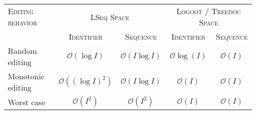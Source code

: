 
\begin{tabularx}{0.9\textwidth}{@{}Xcccc@{}}
  \toprule
  \textsc{Editing behavior} & \multicolumn{2}{c}{\textsc{LSeq Space}} & \multicolumn{2}{c}{\textsc{Logoot} / \textsc{Treedoc Space}} \\ \cmidrule{2-3} \cmidrule{4-5} 
                   & \textsc{Identifier} & \textsc{Sequence} & \textsc{Identifier} & \textsc{Sequence} \\ \midrule
  Random editing & $\mathcal{O}(\log I)$ & $\mathcal{O}(I\log I)$ & $\mathcal{O}\log(I)$ & $\mathcal{O}(I)$\\
  Monotonic editing & $\mathcal{O}((\log I)^2)$ & $\mathcal{O}(I \log I)$ & $\mathcal{O}(I)$ & $\mathcal{O}(I)$ \\
  Worst case & $\mathcal{O}(I^2)$ & $\mathcal{O}(I^2)$ & $\mathcal{O}(I)$ & $\mathcal{O}(I)$  \\ \bottomrule
\end{tabularx}
